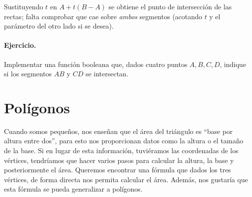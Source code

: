 Sustituyendo $t$ en $A+t(B-A)$ se obtiene el punto de intersección de las rectas; falta comprobar que cae sobre \emph{ambos} segmentos (acotando $t$ y el parámetro del otro lado si se desea).

\paragraph{Ejercicio.} Implementar una función booleana que, dados cuatro puntos $A,B,C,D$, indique si los segmentos $AB$ y $CD$ se intersectan.
\section{Polígonos}

Cuando somos pequeños, nos enseñan que el área del triángulo es ``base por altura entre dos'', para esto nos proporcionan datos como la altura o el tamaño de la base.  Si en lugar de esta información, tuviéramos las coordenadas de los vértices, tendríamos que hacer varios pasos para calcular la altura, la base y posteriormente el área. Queremos encontrar una fórmula que dados los tres vértices, de forma directa nos permita calcular el área. Además, nos gustaría que esta fórmula se pueda generalizar a polígonos.

